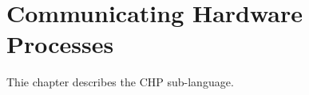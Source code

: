

\chapter{Communicating Hardware Processes}
\label{sec:chp}

Thie chapter describes the CHP sub-language.  


